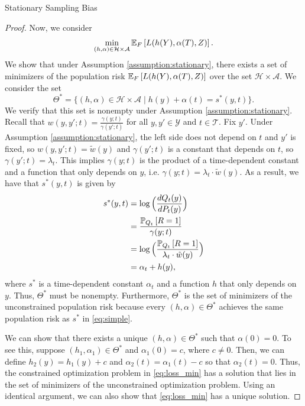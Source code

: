 \documentclass{article}
\theoremstyle{definition}
\theoremstyle{plain}
\theoremstyle{remark}
\begin{document}
\begin{section}{Stationary Sampling Bias}
\begin{proof}
Now, we consider 
\begin{equation}
\min_{(h, \alpha) \in \mathcal{H} \times \mathcal{A}} \EE[F]{L(h(Y), \alpha(T), Z)}.
\end{equation}
We show that under Assumption \ref{assumption:stationary}, there exists a set of minimizers of the population risk $\EE[F]{L(h(Y), \alpha(T), Z)}$ over the set $\mathcal{H} \times \mathcal{A}$. We consider the set
\[ \Theta^{*} = \{(h, \alpha) \in \mathcal{H} \times \mathcal{A} \mid  h(y) + \alpha(t) = s^{*}(y, t)\}.\]
We verify that this set is nonempty under Assumption \ref{assumption:stationary}. Recall that $w(y, y'; t) = \frac{\gamma(y;t)}{\gamma(y'; t)}$ for all $y, y' \in \mathcal{Y}$ and $t \in \mathcal{T}$. Fix $y'$. Under Assumption \ref{assumption:stationary}, the left side does not depend on $t$ and $y'$ is fixed, so $w(y, y'; t) = \tilde{w}(y)$ and $\gamma(y'; t)$ is a constant that depends on $t$, so $\gamma(y'; t) = \lambda_{t}.$ This implies $\gamma(y;t)$ is the product of a time-dependent constant and a function that only depends on $y$, i.e. $\gamma(y;t) = \lambda_{t} \cdot \tilde{w}(y)$. As a result, we have that $s^{*}(y,t)$ is given by
\begin{align*}
s^{*}(y, t) &= \log\Big(\frac{dQ_{t}(y)}{dP_{t}(y)}\Big) \\
&= \frac{\PP[Q_{t}]{R=1}}{\gamma(y;t)} \\
&= \log\Big( \frac{\PP[Q_{t}]{R=1}}{\lambda_{t} \cdot \tilde{w}(y)} \Big) \\
&= \alpha_{t} + h(y),
\end{align*}
where $s^{*}$ is a time-dependent constant $\alpha_{t}$ and a function $h$ that only depends on $y$. Thus, $\Theta^{*}$ must be nonempty. Furthermore, $\Theta^{*}$ is the set of minimizers of the unconstrained population risk because every $(h, \alpha) \in \Theta^{*}$ achieves the same population risk as $s^{*}$ in \eqref{eq:simple}.

We can show that there exists a unique $(h, \alpha) \in \Theta^{*}$ such that $\alpha(0) = 0.$ To see this, suppose $(h_{1}, \alpha_{1}) \in \Theta^{*}$ and $\alpha_{1}(0) = c$, where $c \neq 0$. Then, we can define $h_{2}(y) = h_{1}(y) + c$ and $\alpha_{2}(t) = \alpha_{1}(t) - c$ so that $\alpha_{2}(t) = 0$. Thus, the constrained optimization problem in \eqref{eq:loss_min} has a solution that lies in the set of minimizers of the unconstrained optimization problem. Using an identical argument, we can also show that \eqref{eq:loss_min} has a unique solution.


\end{proof}
\end{section}
\end{document}
